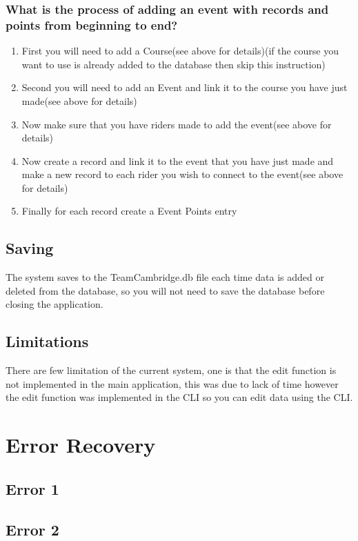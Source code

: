 \subsubsection{What is the process of adding an event with records and points from beginning to end?}
\begin{enumerate}
\item First you will need to add a Course(see above for details)(if the course you want to use is already added to the database then skip this instruction)
\item Second you will need to add an Event and link it to the course you have just made(see above for details)
\item Now make sure that you have riders made to add the event(see above for details)
\item Now create a record and link it to the event that you have just made and make a new record to each rider you wish to connect to the  event(see above for details)
\item Finally for each record create a Event Points entry
\end{enumerate}

\subsection{Saving}
The system saves to the TeamCambridge.db file each time data is added or deleted from the database, so you will not need to save the database before closing the application.
\subsection{Limitations}
There are few limitation of the current system, one is that the edit function is not implemented in the main application, this was due to lack of time however the edit function was implemented in the CLI so you can edit data using the CLI.
\section{Error Recovery}

\subsection{Error 1}

\subsection{Error 2}

